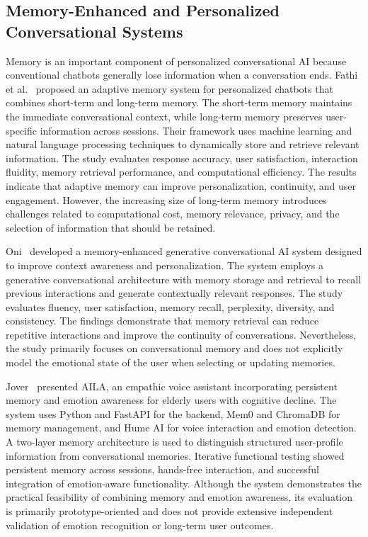 \documentclass[graybox]{svmult}
\begin{document}
\subsection{Memory-Enhanced and Personalized Conversational Systems}

Memory is an important component of personalized conversational AI because conventional chatbots generally lose information when a conversation ends. Fathi et al.~\cite{Fathi2026} proposed an adaptive memory system for personalized chatbots that combines short-term and long-term memory. The short-term memory maintains the immediate conversational context, while long-term memory preserves user-specific information across sessions. Their framework uses machine learning and natural language processing techniques to dynamically store and retrieve relevant information. The study evaluates response accuracy, user satisfaction, interaction fluidity, memory retrieval performance, and computational efficiency. The results indicate that adaptive memory can improve personalization, continuity, and user engagement. However, the increasing size of long-term memory introduces challenges related to computational cost, memory relevance, privacy, and the selection of information that should be retained.

Oni~\cite{Oni2025} developed a memory-enhanced generative conversational AI system designed to improve context awareness and personalization. The system employs a generative conversational architecture with memory storage and retrieval to recall previous interactions and generate contextually relevant responses. The study evaluates fluency, user satisfaction, memory recall, perplexity, diversity, and consistency. The findings demonstrate that memory retrieval can reduce repetitive interactions and improve the continuity of conversations. Nevertheless, the study primarily focuses on conversational memory and does not explicitly model the emotional state of the user when selecting or updating memories.

Jover~\cite{Jover2026} presented AILA, an empathic voice assistant incorporating persistent memory and emotion awareness for elderly users with cognitive decline. The system uses Python and FastAPI for the backend, Mem0 and ChromaDB for memory management, and Hume AI for voice interaction and emotion detection. A two-layer memory architecture is used to distinguish structured user-profile information from conversational memories. Iterative functional testing showed persistent memory across sessions, hands-free interaction, and successful integration of emotion-aware functionality. Although the system demonstrates the practical feasibility of combining memory and emotion awareness, its evaluation is primarily prototype-oriented and does not provide extensive independent validation of emotion recognition or long-term user outcomes.
\end{document}
